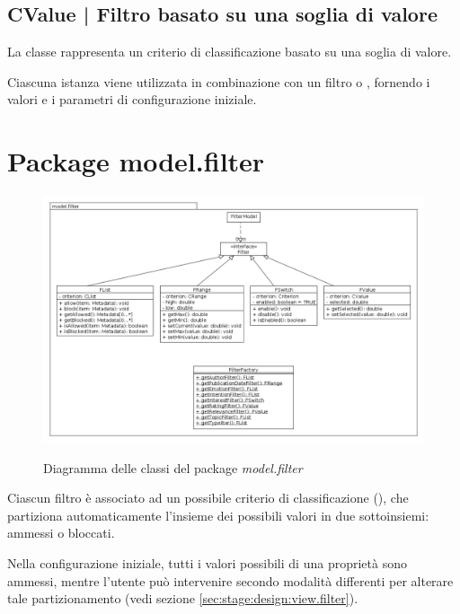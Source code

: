 \documentclass[10pt,a4paper,headinclude,footinclude,hidelinks]{scrreprt} %
\begin{document}
	\subsection[CValue]{CValue | Filtro basato su una soglia di valore}
	\label{sec:stage:design:model.criteria:value-criterion}
	La classe \textit{} rappresenta un criterio di classificazione basato su una soglia di valore.

	Ciascuna istanza viene utilizzata in combinazione con un filtro \textit{} o \textit{}, fornendo i valori e i parametri di configurazione iniziale.

	\section{Package model.filter}
	\label{sec:stage:design:model.filter}

	\begin{figure}[ht]
		\begin{center}
	    	\includegraphics[width=12cm]{class/model_filter.png}
			\label{gfx:class:model:filter}
			\caption{Diagramma delle classi del package \textit{model.filter}}
		\end{center}
	\end{figure}

	Ciascun filtro è associato ad un possibile criterio di classificazione (\textit{}), che partiziona automaticamente l'insieme dei possibili valori in due sottoinsiemi: ammessi o bloccati.

	Nella configurazione iniziale, tutti i valori possibili di una proprietà sono ammessi, mentre l'utente può intervenire secondo modalità differenti per alterare tale partizionamento (vedi sezione \ref{sec:stage:design:view.filter}).
	
\end{document}
